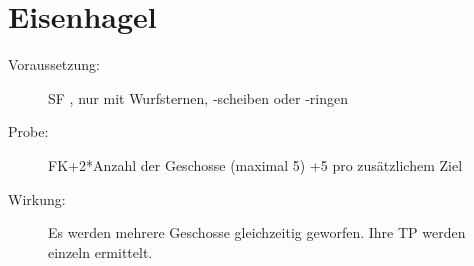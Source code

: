 \section{Eisenhagel}
\label{fernkampf.eisenhagel}
\begin{description}
    \item[Voraussetzung:]
        SF , nur mit Wurfsternen, -scheiben oder -ringen
    \item[Probe:]
        FK+2*Anzahl der Geschosse (maximal 5) +5 pro zusätzlichem Ziel
    \item[Wirkung:]
        Es werden mehrere Geschosse gleichzeitig geworfen. Ihre TP werden einzeln ermittelt.
\end{description}
